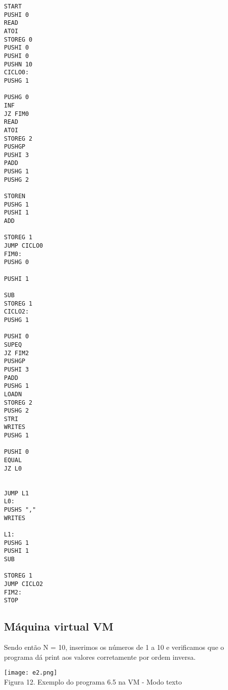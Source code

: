 \documentclass[11pt,a4paper]{report}%
\begin{document}
\begin{lstlisting}[frame=single,numbers=none]
START
PUSHI 0
READ
ATOI
STOREG 0
PUSHI 0
PUSHI 0
PUSHN 10
CICLO0:
PUSHG 1
 
PUSHG 0
INF
JZ FIM0
READ
ATOI
STOREG 2
PUSHGP
PUSHI 3
PADD
PUSHG 1
PUSHG 2

STOREN
PUSHG 1
PUSHI 1
ADD

STOREG 1
JUMP CICLO0
FIM0:
PUSHG 0
 
PUSHI 1

SUB
STOREG 1
CICLO2:
PUSHG 1
 
PUSHI 0
SUPEQ
JZ FIM2
PUSHGP
PUSHI 3
PADD
PUSHG 1
LOADN
STOREG 2
PUSHG 2
STRI
WRITES
PUSHG 1
 
PUSHI 0
EQUAL
JZ L0


JUMP L1
L0:
PUSHS ","
WRITES

L1:
PUSHG 1
PUSHI 1
SUB

STOREG 1
JUMP CICLO2
FIM2:
STOP 
\end{lstlisting}

\subsection{Máquina virtual VM}

Sendo então N = 10, inserimos os números de 1 a 10 e verificamos que o programa dá print aos valores corretamente por ordem inversa.
\begin{center}
    \texttt{[image: e2.png]}
    \\
    \caption{Figura 12. Exemplo do programa 6.5 na VM - Modo texto}
\end{center}
\end{document}
